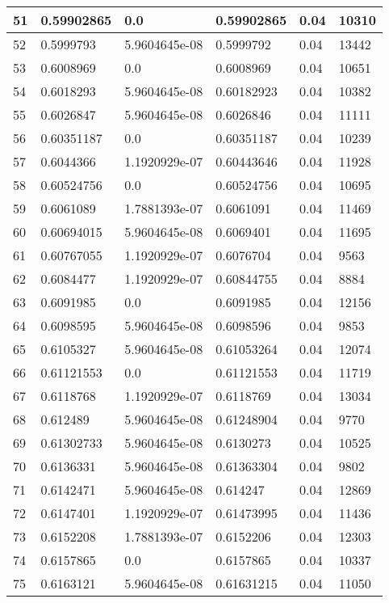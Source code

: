 \begin{longtable}{|l|l|l|l|l|l|}
51 & 0.59902865 & 0.0 & 0.59902865 & 0.04 & 10310 \\ \hline 
52 & 0.5999793 & 5.9604645e-08 & 0.5999792 & 0.04 & 13442 \\ \hline 
53 & 0.6008969 & 0.0 & 0.6008969 & 0.04 & 10651 \\ \hline 
54 & 0.6018293 & 5.9604645e-08 & 0.60182923 & 0.04 & 10382 \\ \hline 
55 & 0.6026847 & 5.9604645e-08 & 0.6026846 & 0.04 & 11111 \\ \hline 
56 & 0.60351187 & 0.0 & 0.60351187 & 0.04 & 10239 \\ \hline 
57 & 0.6044366 & 1.1920929e-07 & 0.60443646 & 0.04 & 11928 \\ \hline 
58 & 0.60524756 & 0.0 & 0.60524756 & 0.04 & 10695 \\ \hline 
59 & 0.6061089 & 1.7881393e-07 & 0.6061091 & 0.04 & 11469 \\ \hline 
60 & 0.60694015 & 5.9604645e-08 & 0.6069401 & 0.04 & 11695 \\ \hline 
61 & 0.60767055 & 1.1920929e-07 & 0.6076704 & 0.04 & 9563 \\ \hline 
62 & 0.6084477 & 1.1920929e-07 & 0.60844755 & 0.04 & 8884 \\ \hline 
63 & 0.6091985 & 0.0 & 0.6091985 & 0.04 & 12156 \\ \hline 
64 & 0.6098595 & 5.9604645e-08 & 0.6098596 & 0.04 & 9853 \\ \hline 
65 & 0.6105327 & 5.9604645e-08 & 0.61053264 & 0.04 & 12074 \\ \hline 
66 & 0.61121553 & 0.0 & 0.61121553 & 0.04 & 11719 \\ \hline 
67 & 0.6118768 & 1.1920929e-07 & 0.6118769 & 0.04 & 13034 \\ \hline 
68 & 0.612489 & 5.9604645e-08 & 0.61248904 & 0.04 & 9770 \\ \hline 
69 & 0.61302733 & 5.9604645e-08 & 0.6130273 & 0.04 & 10525 \\ \hline 
70 & 0.6136331 & 5.9604645e-08 & 0.61363304 & 0.04 & 9802 \\ \hline 
71 & 0.6142471 & 5.9604645e-08 & 0.614247 & 0.04 & 12869 \\ \hline 
72 & 0.6147401 & 1.1920929e-07 & 0.61473995 & 0.04 & 11436 \\ \hline 
73 & 0.6152208 & 1.7881393e-07 & 0.6152206 & 0.04 & 12303 \\ \hline 
74 & 0.6157865 & 0.0 & 0.6157865 & 0.04 & 10337 \\ \hline 
75 & 0.6163121 & 5.9604645e-08 & 0.61631215 & 0.04 & 11050 \\ \hline 
\end{longtable}
